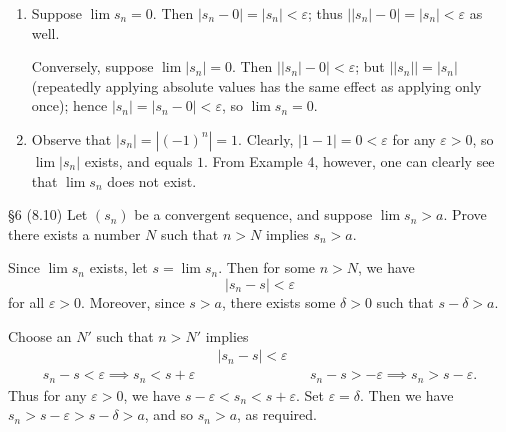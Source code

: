 \documentclass{homework}
\begin{document}
\begin{solution}
  \begin{enumerate}[label=(\alph*)]
    \item Suppose $\lim{s_n}=0$. Then $\left| s_n-0 \right| =\left| s_n \right| <\varepsilon$; thus
      $\left| \left| s_n \right| -0 \right| =\left| s_n \right| <\varepsilon$ as well.

      Conversely, suppose $\lim{\left| s_n \right|}=0$. Then $\left| \left| s_n \right| -0
      \right|<\varepsilon $; but $\left| \left| s_n \right|  \right| =\left| s_n \right|$
      (repeatedly applying absolute values has the same effect as applying only once); hence $\left|
      s_n \right| =\left| s_n-0 \right| <\varepsilon$, so $\lim{s_n}=0$.
    \item Observe that $ \left| s_n \right| =\left| (-1)^{n} \right| =1$. Clearly, $\left| 1-1
      \right| =0<\varepsilon$ for any $\varepsilon>0$, so $\lim{\left| s_n \right| }$ exists, and
      equals $1$. From Example 4, however, one can clearly see that $\lim{s_n}$ does not exist.
  \end{enumerate}
\end{solution}

\begin{problem}{\S 6}
  (8.10) Let $(s_n)$ be a convergent sequence, and suppose $\lim{s_n}>a$. Prove there exists a
  number $N$ such that $n>N$ implies $s_n >a$.
\end{problem}

\begin{solution}
  Since $\lim{s_n}$ exists, let $s=\lim{s_n}$. Then for some $n>N$, we have \[
    \left| s_n-s \right| <\varepsilon
  \] for all $\varepsilon>0$. Moreover, since $s>a$, there exists some $\delta>0$ such that
  $s-\delta>a$. 

  Choose an $N'$ such that $n>N'$ implies
  \begin{align*}
    && \left| s_n-s \right| <\varepsilon&&\\
    s_n-s<\varepsilon \implies s_n<s+\varepsilon&& &&s_n-s>-\varepsilon\implies s_n>s-\varepsilon
  .\end{align*}
  Thus for any $\varepsilon>0$, we have $s-\varepsilon<s_n<s+\varepsilon$. Set $\varepsilon=\delta$.
  Then we have $s_n>s-\varepsilon>s-\delta>a$, and so $s_n>a$, as required.
\end{solution}
\end{document}

